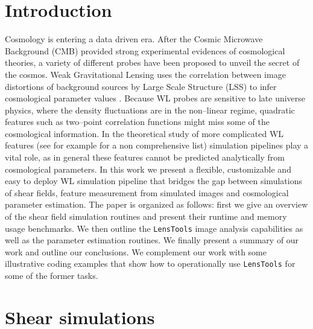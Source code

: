 \documentclass[5p]{elsarticle}
\newcommand{\LT}{\texttt{LensTools} }
\begin{document}
\section{Introduction}
%
Cosmology is entering a data driven era. After the Cosmic Microwave Background (CMB) \citep{WMAP,PlanckXVI2013} provided strong experimental evidences of cosmological theories, a variety of different probes have been proposed to unveil the secret of the cosmos. Weak Gravitational Lensing uses the correlation between image distortions of background sources by Large Scale Structure (LSS) to infer cosmological parameter values \citep{WLprimer}. Because WL probes are sensitive to late universe physics, where the density fluctuations are in the non--linear regime, quadratic features such as two--point correlation functions might miss some of the cosmological information. In the theoretical study of more complicated WL features (see for example \citep{3pcf1,bispectrum1,moments1,peaks1} for a non comprehensive list) simulation pipelines play a vital role, as in general these features cannot be predicted analytically from cosmological parameters. In this work we present a flexible, customizable and easy to deploy WL simulation pipeline that bridges the gap between simulations of shear fields, feature measurement from simulated images and cosmological parameter estimation. The paper is organized as follows: first we give an overview of the shear field simulation routines and present their runtime and memory usage benchmarks. We then outline the \LT image analysis capabilities as well as the parameter estimation routines. We finally present a summary of our work and outline our conclusions. We complement our work with some illustrative coding examples that show how to operationally use \LT for some of the former tasks.


\section{Shear simulations} 
\label{shearsim}
\end{document}
